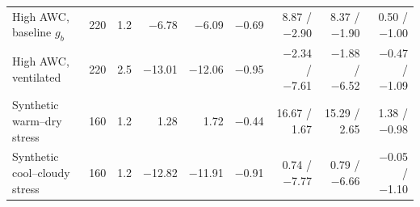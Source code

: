 \documentclass[preprint,12pt,a4paper]{elsarticle}
\begin{document}
\begin{table}[htbp]
\begin{tabular}{@{}l r r rrr rrr@{}}
High AWC, baseline $g_b$ & \num{220} & \num{1.2} & \num{-6.78} & \num{-6.09} & \num{-0.69} & \num{+8.87} / \num{-2.90} & \num{+8.37} / \num{-1.90} & \num{+0.50} / \num{-1.00} \\
High AWC, ventilated & \num{220} & \num{2.5} & \num{-13.01} & \num{-12.06} & \num{-0.95} & \num{-2.34} / \num{-7.61} & \num{-1.88} / \num{-6.52} & \num{-0.47} / \num{-1.09} \\
\midrule
Synthetic warm--dry stress & \num{160} & \num{1.2} & \num{+1.28} & \num{+1.72} & \num{-0.44} & \num{+16.67} / \num{+1.67} & \num{+15.29} / \num{+2.65} & \num{+1.38} / \num{-0.98} \\
Synthetic cool--cloudy stress & \num{160} & \num{1.2} & \num{-12.82} & \num{-11.91} & \num{-0.91} & \num{+0.74} / \num{-7.77} & \num{+0.79} / \num{-6.66} & \num{-0.05} / \num{-1.10} \\
\bottomrule
\end{tabular}
\end{table}
\end{document}
